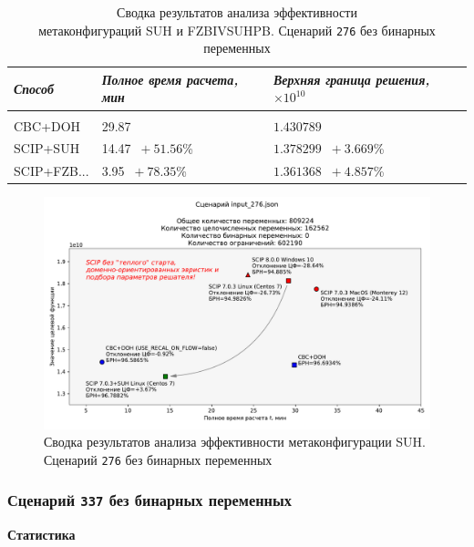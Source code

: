 \documentclass[%
	11pt,
	a4paper,
	utf8,
		]{article}
\begin{document}
{
	\begin{table}[!h]
		\centering
		\caption{Сводка результатов анализа эффективности \\метаконфигураций SUH и FZBIVSUHPB. Сценарий \texttt{276} без бинарных переменных}
		\begin{tabular}{ p{2.5cm} p{3.3cm} p{3.4cm} }
			\emph{Способ} & \emph{Полное время расчета, мин} & \emph{Верхняя граница решения, $ \times 10^{10} $} \\
			\hline\hline\\[-3.5mm]
			{CBC+DOH} & 29.87 & $ 1.430789 $ \\
			\hline
			SCIP+SUH & 14.47 {\color{blue} $\ +51.56 $\%} & $ 1.378299 $ {\color{blue} $\ +3.669 $\%} \\
			\hline
			SCIP+FZB... & 3.95 {\color{blue} $\ +78.35 $\%} & $ 1.361368 $ {\color{blue} $\ +4.857 $\%} \\
		\end{tabular}\label{tab:276_wo_bins}
	\end{table}
}


\begin{figure}[!h]
	\centering
	\includegraphics[scale=0.6]{figures/summary_276.pdf}
	\caption{Сводка результатов анализа эффективности метаконфигурации SUH. \\Сценарий \texttt{276} без бинарных переменных}\label{fig:summary_276}
\end{figure}

\subsubsection{Сценарий \texttt{337} без бинарных переменных}

\textbf{Статистика}\vspace*{1mm}
\end{document}
